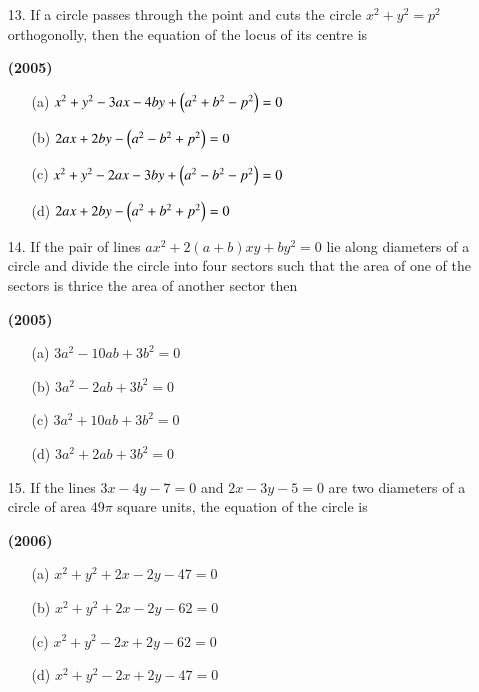 \documentclass[journal,12pt,twocolumn]{IEEEtran}
\theoremstyle{remark}
\begin{document}
\begin{enumerate}
\item[13.]If a circle passes through the point  and cuts the circle $x^2+y^2=p^2$ orthogonolly, then the equation of the locus of its centre is 

\hfill{\textbf{(2005)}}

\begin{enumerate}
\item[(a)] $x^2+y^2-3ax-4by+\left(a^2+b^2-p^2\right)=0$
\item[(b)] $2ax+2by-\left(a^2-b^2+p^2\right)=0$
\item[(c)] $x^2+y^2-2ax-3by+\left(a^2-b^2-p^2\right)=0$
\item[(d)] $2ax+2by-\left(a^2+b^2+p^2\right)=0$
\end{enumerate}
\end{enumerate}
\begin{enumerate}
\item[14.]If the pair of lines $ax^2+2(a+b)xy+by^2=0$ lie along diameters of a circle and divide the circle into four sectors such that the area of one of the sectors is thrice the area of another sector then

\hfill{\textbf{(2005)}}

\begin{enumerate}
\item[(a)] $3a^2-10ab+3b^2=0$
\item[(b)] $3a^2-2ab+3b^2=0$
\item[(c)] $3a^2+10ab+3b^2=0$
\item[(d)] $3a^2+2ab+3b^2=0$
\end{enumerate}
\end{enumerate}
\begin{enumerate}
\item[15.]If the lines $3x-4y-7=0$ and $2x-3y-5=0$ are two diameters of a circle of area $49\pi$ square units, the equation of the circle is 

\hfill{\textbf{(2006)}}

\begin{enumerate}
\item[(a)] $x^2+y^2+2x-2y-47=0$
\item[(b)] $x^2+y^2+2x-2y-62=0$
\item[(c)] $x^2+y^2-2x+2y-62=0$
\item[(d)] $x^2+y^2-2x+2y-47=0$
\end{enumerate}
\end{enumerate}
\end{document}
